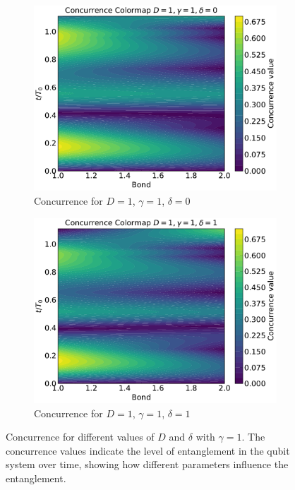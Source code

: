 \begin{figure}[h!]
    \vspace{0.5cm}

    \begin{subfigure}[b]{0.48\textwidth}
        \centering
        \includegraphics[width=\linewidth]{results_and_discussion/3_qubits/up_down_with_ana_1_1_0.pdf}
        \caption{Concurrence for \( D = 1\), \( \gamma = 1\), \( \delta = 0\)}
        \label{fig:subfig3}
    \end{subfigure}
    \hfill
    \begin{subfigure}[b]{0.48\textwidth}
        \centering
        \includegraphics[width=\linewidth]{results_and_discussion/3_qubits/up_down_with_ana_1_1_1.pdf}
        \caption{Concurrence for \( D = 1\), \( \gamma = 1\), \( \delta = 1\)}
        \label{fig:subfig4}
    \end{subfigure}

    \caption{Concurrence for different values of \( D \) and \( \delta \) with \( \gamma = 1 \). The concurrence values indicate the level of entanglement in the qubit system over time, showing how different parameters influence the entanglement.}
    \label{fig:concurrence_comparison}
\end{figure}


